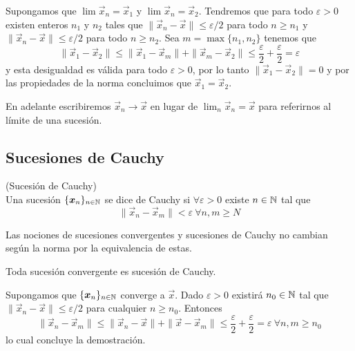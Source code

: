 \begin{demostracion}
Supongamos que $\lim \vec{x}_n = \vec{x}_1$ y  $\lim \vec{x}_n = \vec{x}_2$. Tendremos que para todo $\varepsilon > 0$ existen enteros $n_1$ y $n_2$ tales que $\|\vec{x}_n-\vec{x}\|\leq \varepsilon/2$ para todo $n\geq n_1$ y  $\|\vec{x}_n-\vec{x}\|\leq \varepsilon/2$ para todo $n\geq n_2$. Sea $m = \max\{n_1,n_2\}$ tenemos que
$$\|\vec{x}_1 - \vec{x}_2 \| \leq \|\vec{x}_1 - \vec{x}_{m} \| + \|\vec{x}_{m} - \vec{x}_2 \| \leq \frac{\varepsilon}{2} + \frac{\varepsilon}{2} = \varepsilon$$
y esta desigualdad es v\'alida para todo $\varepsilon > 0$, por lo tanto $\|\vec{x}_1 - \vec{x}_2 \| = 0$ y por las propiedades de la norma concluimos que $\vec{x}_1 = \vec{x}_2$.
\end{demostracion}

\begin{nota}
En adelante escribiremos $\vec{x}_n \to \vec{x}$ en lugar de $ \lim_{n} \vec{x}_n = \vec{x}$ para referirnos al l\'imite de una sucesi\'on.
\end{nota}

\subsection{Sucesiones de Cauchy}

\begin{definicion}{\rm (Sucesi\'on de Cauchy)}
\\Una sucesi\'on $\{\boldsymbol{x}_n\}_{n\in \mathbb{N}}$ se dice de Cauchy si $\forall \varepsilon >0$ existe $n\in \mathbb{N}$ tal que
$$\|\vec{x}_n-\vec{x}_m\|<\varepsilon\: \forall n,m\geq N$$
\end{definicion}

\begin{nota}
Las nociones de sucesiones convergentes y sucesiones de Cauchy no cambian seg\'un la norma por la equivalencia de estas.
\end{nota}

\begin{proposicion}
Toda sucesi\'on convergente es sucesi\'on de Cauchy.
\end{proposicion}

\begin{demostracion}
Supongamos que $\{\boldsymbol{x}_n\}_{n\in \mathbb{N}}$ converge a $\vec{x}$. Dado $\varepsilon > 0$ existir\'a $n_0 \in \mathbb{N}$ tal que $\|\vec{x}_n - \vec{x}\|\leq \varepsilon / 2$ para cualquier $n \geq n_0$. Entonces 
$$\|\vec{x}_n - \vec{x}_m\| \leq \|\vec{x}_n - \vec{x}\| + \|\vec{x} - \vec{x}_m\| \leq \frac{\varepsilon}{2} + \frac{\varepsilon}{2} = \varepsilon \: \forall n,m \geq n_0$$ 
lo cual concluye la demostraci\'on.
\end{demostracion}


